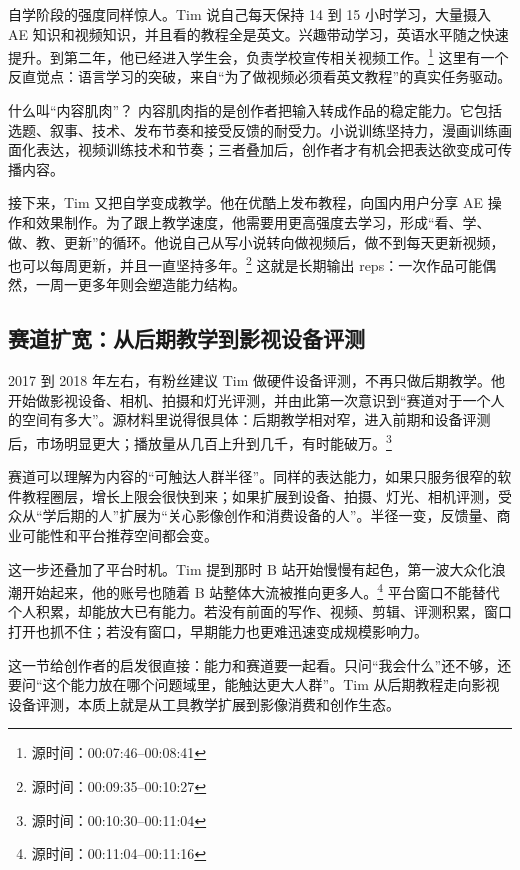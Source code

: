 \documentclass[a4paper]{article}
\begin{document}
自学阶段的强度同样惊人。Tim 说自己每天保持 14 到 15 小时学习，大量摄入 AE 知识和视频知识，并且看的教程全是英文。兴趣带动学习，英语水平随之快速提升。到第二年，他已经进入学生会，负责学校宣传相关视频工作。\footnote{源时间：00:07:46--00:08:41} 这里有一个反直觉点：语言学习的突破，来自“为了做视频必须看英文教程”的真实任务驱动。

\begin{knowledgebox}{什么叫“内容肌肉”？}
内容肌肉指的是创作者把输入转成作品的稳定能力。它包括选题、叙事、技术、发布节奏和接受反馈的耐受力。小说训练坚持力，漫画训练画面化表达，视频训练技术和节奏；三者叠加后，创作者才有机会把表达欲变成可传播内容。
\end{knowledgebox}

接下来，Tim 又把自学变成教学。他在优酷上发布教程，向国内用户分享 AE 操作和效果制作。为了跟上教学速度，他需要用更高强度去学习，形成“看、学、做、教、更新”的循环。他说自己从写小说转向做视频后，做不到每天更新视频，也可以每周更新，并且一直坚持多年。\footnote{源时间：00:09:35--00:10:27} 这就是长期输出 reps：一次作品可能偶然，一周一更多年则会塑造能力结构。

\subsection{赛道扩宽：从后期教学到影视设备评测}

2017 到 2018 年左右，有粉丝建议 Tim 做硬件设备评测，不再只做后期教学。他开始做影视设备、相机、拍摄和灯光评测，并由此第一次意识到“赛道对于一个人的空间有多大”。源材料里说得很具体：后期教学相对窄，进入前期和设备评测后，市场明显更大；播放量从几百上升到几千，有时能破万。\footnote{源时间：00:10:30--00:11:04}

赛道可以理解为内容的“可触达人群半径”。同样的表达能力，如果只服务很窄的软件教程圈层，增长上限会很快到来；如果扩展到设备、拍摄、灯光、相机评测，受众从“学后期的人”扩展为“关心影像创作和消费设备的人”。半径一变，反馈量、商业可能性和平台推荐空间都会变。

这一步还叠加了平台时机。Tim 提到那时 B 站开始慢慢有起色，第一波大众化浪潮开始起来，他的账号也随着 B 站整体大流被推向更多人。\footnote{源时间：00:11:04--00:11:16} 平台窗口不能替代个人积累，却能放大已有能力。若没有前面的写作、视频、剪辑、评测积累，窗口打开也抓不住；若没有窗口，早期能力也更难迅速变成规模影响力。

这一节给创作者的启发很直接：能力和赛道要一起看。只问“我会什么”还不够，还要问“这个能力放在哪个问题域里，能触达更大人群”。Tim 从后期教程走向影视设备评测，本质上就是从工具教学扩展到影像消费和创作生态。
\end{document}
